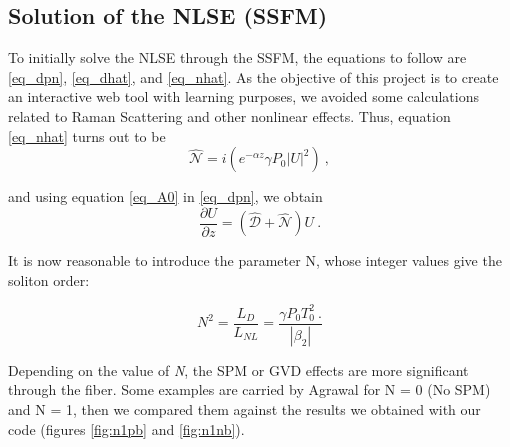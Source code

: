        \subsection{Solution of the NLSE (SSFM)}
            To initially solve the NLSE through the SSFM, the equations to follow are \eqref{eq_dpn}, \eqref{eq_dhat}, and \eqref{eq_nhat}. As the objective of this project is to create an interactive web tool with learning purposes, we avoided some calculations related to Raman Scattering and other nonlinear effects. Thus, equation \eqref{eq_nhat} turns out to be 
            \begin{equation} \label{eq_nhat2}
             \hat{\mathcal{N}} = i \left( 
             e^{-\alpha z} \gamma P_0 \left|U\right|^2 
             \right) \ ,
        \end{equation}
        
        and using equation \eqref{eq_A0} in \eqref{eq_dpn}, we obtain
        \begin{equation}\label{eq_dpn2}
            \frac{\partial U}{\partial z} = \left( \hat{\mathcal{D}} + \hat{\mathcal{N}} \right) U \ . 
        \end{equation}
        
        It is now reasonable to introduce the parameter N, whose integer values give the soliton order:
        
        \begin{equation}\label{eq_n}
            N^2 = \frac{L_D}{L_{NL}} = \frac{\gamma P_0 T^2_0 \ . }{\left|\beta_2\right|}
        \end{equation}
        
        
        Depending on the value of \emph{N}, the SPM or GVD effects are more significant through the fiber. Some examples are carried by Agrawal \citep{AgrawalBook} for N = 0 (No SPM) and N = 1, then we compared them against the results we obtained with our code (figures \ref{fig:n1pb} and \ref{fig:n1nb}). 
        
